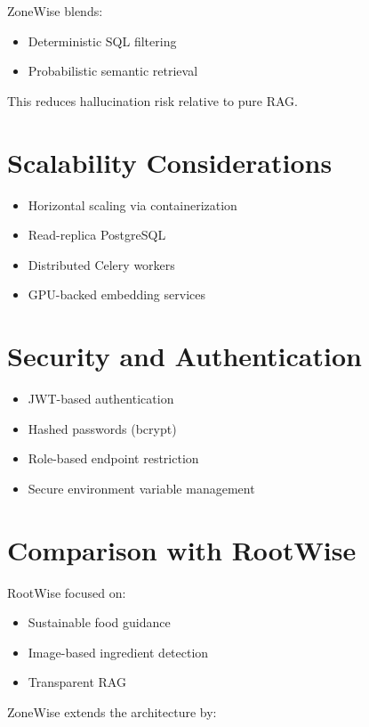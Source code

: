 \documentclass[11pt,twocolumn]{article}
\begin{document}
ZoneWise blends:

\begin{itemize}
    \item Deterministic SQL filtering
    \item Probabilistic semantic retrieval
\end{itemize}

This reduces hallucination risk relative to pure RAG.

\section{Scalability Considerations}

\begin{itemize}
    \item Horizontal scaling via containerization
    \item Read-replica PostgreSQL
    \item Distributed Celery workers
    \item GPU-backed embedding services
\end{itemize}

\section{Security and Authentication}

\begin{itemize}
    \item JWT-based authentication
    \item Hashed passwords (bcrypt)
    \item Role-based endpoint restriction
    \item Secure environment variable management
\end{itemize}

\section{Comparison with RootWise}

RootWise \cite{faris2025rootwise} focused on:

\begin{itemize}
    \item Sustainable food guidance
    \item Image-based ingredient detection
    \item Transparent RAG
\end{itemize}

ZoneWise extends the architecture by:
\end{document}
